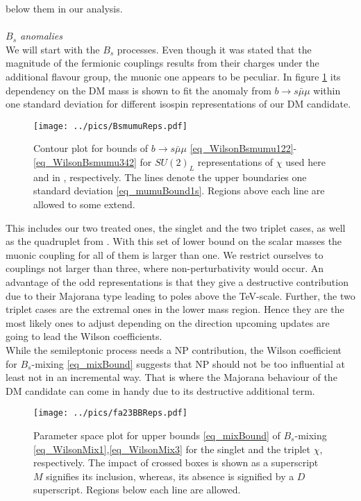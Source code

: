 below them in our analysis. 
\\ \\ \textit{$B_s$ anomalies}\\
\noindent We will start with the $B_s$ processes. Even though it was stated that the magnitude of the fermionic couplings results from their charges
under the additional flavour group, the muonic one appears to be peculiar. In figure \ref{pic_BsMumuReps} its dependency on
the DM mass is shown to fit the anomaly from $b\rightarrow s\bar\mu\mu$ within one standard deviation for different isospin representations of our DM
candidate. 
\begin{figure}[t]
 \texttt{[image: ../pics/BsmumuReps.pdf]}
 \caption{Contour plot for bounds of $b\rightarrow s\bar\mu\mu$  \eqref{eq_WilsonBsmumu122}-\eqref{eq_WilsonBsmumu342} for  $SU(2)_L$ 
 representations of $\chi$ used here and in \cite{Grip}, respectively.  The lines denote the upper boundaries one standard deviation 
 \eqref{eq_mumuBound1s}. Regions above each line are allowed to some extend.}
 \label{pic_BsMumuReps}
\end{figure}
This includes our two treated ones, the singlet and the two triplet cases, as well as the quadruplet from \cite{Grip}. 
With this set of lower bound on the scalar masses the muonic coupling for all of them is larger than one. We restrict
ourselves to couplings not larger than three, where non-perturbativity would occur. An advantage of the odd representations is
that they give a destructive contribution due to their Majorana type leading to poles above the TeV-scale. Further, the two triplet cases
are the extremal ones in the lower mass region. Hence they are the most likely ones to adjust depending on the direction upcoming updates are 
going to lead the Wilson coefficients.\\
\noindent While the semileptonic process needs a NP contribution, the Wilson coefficient 
for $B_s$-mixing \eqref{eq_mixBound} suggests that NP should not be too influential at least not in an incremental way. That is where the Majorana
behaviour of the DM candidate can come in handy due to its destructive additional term. 
\begin{figure}[t]
 \texttt{[image: ../pics/fa23BBReps.pdf]}
 \caption{Parameter space plot for upper bounds \eqref{eq_mixBound} of $B_s$-mixing \eqref{eq_WilsonMix1},\eqref{eq_WilsonMix3} for the singlet and 
 the triplet $\chi$, respectively. The impact of crossed boxes is shown as a superscript $M$ signifies its inclusion, whereas, its absence is
 signified by a $D$ superscript. Regions below each line are allowed.}
 \label{pic_BsMixRepsMajorana}
\end{figure}
